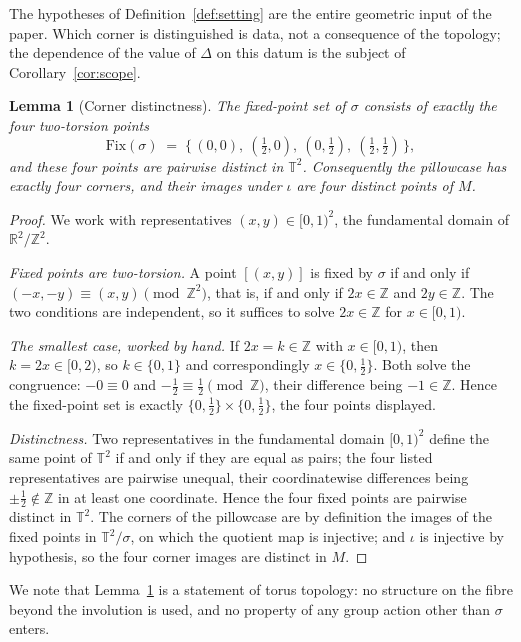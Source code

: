 \documentclass[11pt,a4paper]{article}
\newcommand{\T}{\mathbb{T}}
\newcommand{\R}{\mathbb{R}}
\newcommand{\Z}{\mathbb{Z}}
\theoremstyle{plain}
\newtheorem{lemma}[theorem]{Lemma}
\theoremstyle{definition}
\theoremstyle{remark}
\begin{document}
The hypotheses of Definition~\ref{def:setting} are the entire geometric input of the paper. Which corner is distinguished is data, not a consequence of the topology; the dependence of the value of $\Delta$ on this datum is the subject of Corollary~\ref{cor:scope}.

\begin{lemma}[Corner distinctness]\label{lem:corners}
The fixed-point set of $\sigma$ consists of exactly the four two-torsion points
\[
\mathrm{Fix}(\sigma) \;=\; \bigl\{\, (0,0),\ (\tfrac12, 0),\ (0, \tfrac12),\ (\tfrac12, \tfrac12) \,\bigr\},
\]
and these four points are pairwise distinct in $\T^2$. Consequently the pillowcase has exactly four corners, and their images under $\iota$ are four distinct points of $M$.
\end{lemma}

\begin{proof}
We work with representatives $(x,y) \in [0,1)^2$, the fundamental domain of $\R^2/\Z^2$.

\emph{Fixed points are two-torsion.} A point $[(x,y)]$ is fixed by $\sigma$ if and only if $(-x,-y) \equiv (x,y) \pmod{\Z^2}$, that is, if and only if $2x \in \Z$ and $2y \in \Z$. The two conditions are independent, so it suffices to solve $2x \in \Z$ for $x \in [0,1)$.

\emph{The smallest case, worked by hand.} If $2x = k \in \Z$ with $x \in [0,1)$, then $k = 2x \in [0,2)$, so $k \in \{0, 1\}$ and correspondingly $x \in \{0, \tfrac12\}$. Both solve the congruence: $-0 \equiv 0$ and $-\tfrac12 \equiv \tfrac12 \pmod{\Z}$, their difference being $-1 \in \Z$. Hence the fixed-point set is exactly $\{0, \tfrac12\} \times \{0, \tfrac12\}$, the four points displayed.

\emph{Distinctness.} Two representatives in the fundamental domain $[0,1)^2$ define the same point of $\T^2$ if and only if they are equal as pairs; the four listed representatives are pairwise unequal, their coordinatewise differences being $\pm\tfrac12 \notin \Z$ in at least one coordinate. Hence the four fixed points are pairwise distinct in $\T^2$. The corners of the pillowcase are by definition the images of the fixed points in $\T^2/\sigma$, on which the quotient map is injective; and $\iota$ is injective by hypothesis, so the four corner images are distinct in $M$.
\end{proof}

We note that Lemma~\ref{lem:corners} is a statement of torus topology: no structure on the fibre beyond the involution is used, and no property of any group action other than $\sigma$ enters.
\end{document}
